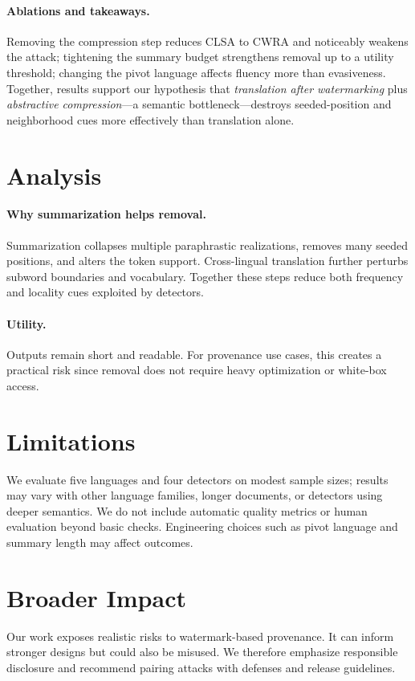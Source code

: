 \documentclass{article}
\begin{document}
\paragraph{Ablations and takeaways.}
Removing the compression step reduces CLSA to CWRA and noticeably weakens the attack; tightening the summary budget strengthens removal up to a utility threshold; changing the pivot language affects fluency more than evasiveness. Together, results support our hypothesis that \emph{translation after watermarking} plus \emph{abstractive compression}—a semantic bottleneck—destroys seeded-position and neighborhood cues more effectively than translation alone.

\section{Analysis}
\paragraph{Why summarization helps removal.} Summarization collapses multiple paraphrastic realizations, removes many seeded positions, and alters the token support. Cross-lingual translation further perturbs subword boundaries and vocabulary. Together these steps reduce both frequency and locality cues exploited by detectors.
\paragraph{Utility.} Outputs remain short and readable. For provenance use cases, this creates a practical risk since removal does not require heavy optimization or white-box access.

\section{Limitations}
We evaluate five languages and four detectors on modest sample sizes; results may vary with other language families, longer documents, or detectors using deeper semantics. We do not include automatic quality metrics or human evaluation beyond basic checks. Engineering choices such as pivot language and summary length may affect outcomes.

\section{Broader Impact}
Our work exposes realistic risks to watermark-based provenance. It can inform stronger designs but could also be misused. We therefore emphasize responsible disclosure and recommend pairing attacks with defenses and release guidelines.
\end{document}
